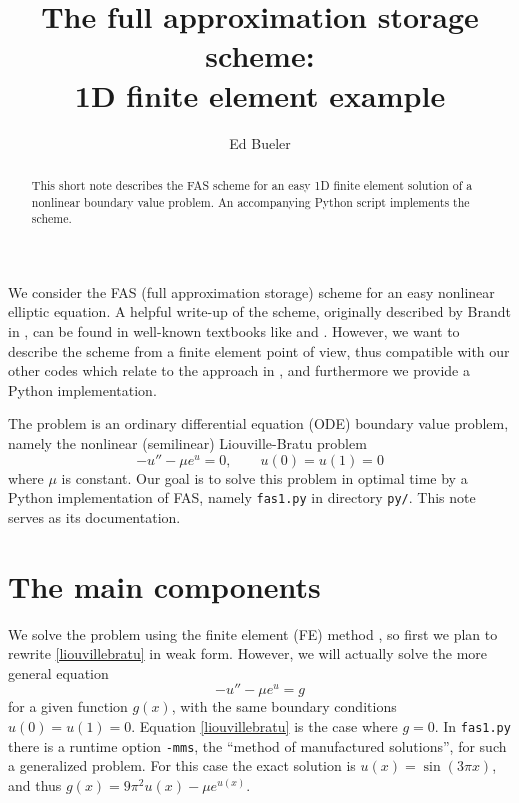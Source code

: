 \documentclass[letterpaper,final,12pt,reqno]{amsart}
\begin{document}
\title[Full approximation storage]{The full approximation storage scheme: \\ 1D finite element example}

\author{Ed Bueler}

\begin{abstract}  This short note describes the FAS scheme for an easy 1D finite element solution of a nonlinear boundary value problem.  An accompanying Python script implements the scheme.
\end{abstract}

\maketitle

\thispagestyle{empty}
\bigskip

We consider the FAS (full approximation storage) scheme for an easy nonlinear elliptic equation.  A helpful write-up of the scheme, originally described by Brandt in  \cite{Brandt1977}, can be found in well-known textbooks like \cite[Chapter 6]{Briggsetal2000} and \cite{Trottenbergetal2001}.  However, we want to describe the scheme from a finite element point of view, thus compatible with our other codes which relate to the approach in \cite{GraeserKornhuber2009}, and furthermore we provide a Python implementation.

The problem is an ordinary differential equation (ODE) boundary value problem, namely the nonlinear (semilinear) Liouville-Bratu problem \cite{Bueler2021}
\begin{equation}
  -u'' - \mu e^u = 0,  \qquad u(0) = u(1) = 0  \label{liouvillebratu}
\end{equation}
where $\mu$ is constant.  Our goal is to solve this problem in optimal time by a Python implementation of FAS, namely \texttt{fas1.py} in directory \texttt{py/}.  This note serves as its documentation.


\section{The main components}

We solve the problem using the finite element (FE) method \cite{Bueler2021,Elmanetal2014}, so first we plan to rewrite \eqref{liouvillebratu} in weak form.  However, we will actually solve the more general equation
\begin{equation}
  -u'' - \mu e^u = g  \label{stronggeneral}
\end{equation}
for a given function $g(x)$, with the same boundary conditions $u(0)=u(1)=0$.  Equation \eqref{liouvillebratu} is the case where $g=0$.  In \texttt{fas1.py} there is a runtime option \texttt{-mms}, the ``method of manufactured solutions'', for such a generalized problem.  For this case the exact solution is $u(x)=\sin(3\pi x)$, and thus $g(x)=9\pi^2 u(x)-\mu e^{u(x)}$.
\end{document}
